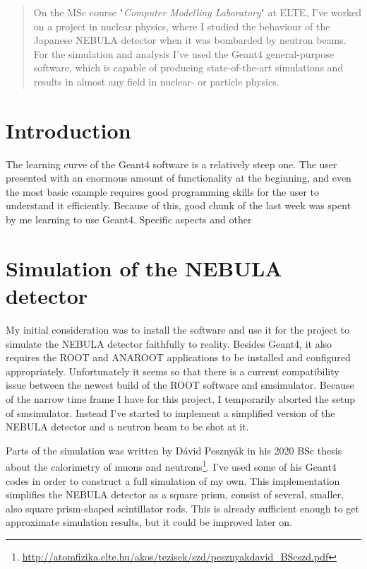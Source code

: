 \begin{abstract}
	On the MSc course "\textit{Computer Modelling Laboratory}" at ELTE, I've worked on a project in nuclear physics, where I studied the behaviour of the Japanese NEBULA detector when it was bombarded by neutron beams. For the simulation and analysis I've used the Geant4 general-purpose software, which is capable of producing state-of-the-art simulations and results in almost any field in nuclear- or particle physics.
\end{abstract}

\begin{multicols}{2}
\section{Introduction}
The learning curve of the Geant4 software is a relatively steep one. The user presented with an enormous amount of functionality at the beginning, and even the most basic example requires good programming skills for the user to understand it efficiently. Because of this, good chunk of the last week was spent by me learning to use Geant4. Specific aspects and other 

\section{Simulation of the NEBULA detector}
My initial consideration was to install the software  and use it for the project to simulate the NEBULA detector faithfully to reality. Besides Geant4, it also requires the ROOT and ANAROOT applications to be installed and configured appropriately. Unfortunately it seems so that there is a current compatibility issue between the newest build of the ROOT software and smsimulator. Because of the narrow time frame I have for this project, I temporarily aborted the setup of smsimulator. Instead I've started to implement a simplified version of the NEBULA detector and a neutron beam to be shot at it.

Parts of the simulation was written by Dávid Pesznyák in his 2020 BSc thesis about the calorimetry of muons and neutrons\footnote{\url{http://atomfizika.elte.hu/akos/tezisek/szd/pesznyakdavid_BScszd.pdf}}. I've used some of his Geant4 codes in order to construct a full simulation of my own. This implementation simplifies the NEBULA detector as a square prism, consist of several, smaller, also square prism-shaped scintillator rods. This is already sufficient enough to get approximate simulation results, but it could be improved later on.


\end{multicols}
